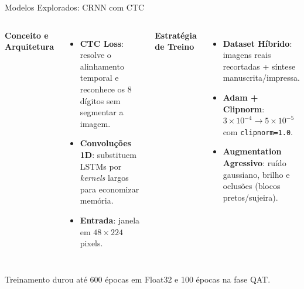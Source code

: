 \documentclass[
    aspectratio=169,
    12pt,
    brazil
]{beamer}
\begin{document}
\begin{frame}{Modelos Explorados: CRNN com CTC}
  \begin{columns}[t]
    {\small\bfseries\color{senacblue}Conceito e Arquitetura}
    \begin{itemize}\small
      \item \textbf{CTC Loss}: resolve o alinhamento temporal e reconhece os 8 dígitos sem segmentar a imagem.
      \item \textbf{Convoluções 1D}: substituem LSTMs por \textit{kernels} largos para economizar memória.
      \item \textbf{Entrada}: janela em $48 \times 224$ pixels.
    \end{itemize}

    {\small\bfseries\color{senacblue}Estratégia de Treino}
    \begin{itemize}\small
      \item \textbf{Dataset Híbrido}: imagens reais recortadas + síntese manuscrita/impressa.
      \item \textbf{Adam + Clipnorm}: $3 \times 10^{-4} \rightarrow 5 \times 10^{-5}$ com \texttt{clipnorm=1.0}.
      \item \textbf{Augmentation Agressivo}: ruído gaussiano, brilho e oclusões (blocos pretos/sujeira).
    \end{itemize}
  \end{columns}

  \vspace{0.4cm}
  \centering
  {\scriptsize\color{black!70} Treinamento durou até 600 épocas em Float32 e 100 épocas na fase QAT.}
\end{frame}
\end{document}
